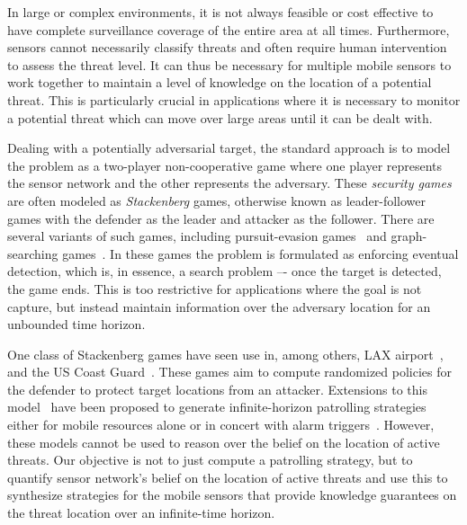 In large or complex environments, it is not always feasible or cost effective to have complete surveillance coverage of the entire area at all times. Furthermore, sensors cannot necessarily classify threats and often require human intervention to assess the threat level. It can thus be necessary for multiple mobile sensors to work together to maintain a level of knowledge on the location of a potential threat. This is particularly crucial in applications where it is necessary to monitor a potential threat which can move over large areas until it can be dealt with.  

Dealing with a potentially adversarial target, the standard approach is to model the problem as a two-player non-cooperative game where one player represents the sensor network and the other represents the adversary. These \emph{security games} are often modeled as \emph{Stackenberg} games, otherwise known as leader-follower games with the defender as the leader and attacker as the follower. There are several variants of such games, including pursuit-evasion games~\cite{Chung2011} and graph-searching games~\cite{Kreutzer11}. In these games the problem is formulated as enforcing eventual detection, which is, in essence, a search problem –- once the target is detected, the game ends. This is too restrictive for applications where the goal is not capture, but instead maintain information over the adversary location for an unbounded time horizon.

One class of Stackenberg games have seen use in, among others, LAX airport~\cite{Pita08},~\cite{jain2012overview} and the US Coast Guard~\cite{An11}. These games aim to compute randomized policies for the defender to protect target locations from an attacker. Extensions to this model~\cite{Basilico12} have been proposed to generate infinite-horizon patrolling strategies either for mobile resources alone or in concert with alarm triggers~\cite{basilico2016security,Munoz13}. However, these models cannot be used to reason over the belief on the location of active threats. Our objective is not to just compute a patrolling strategy, but to quantify sensor network's belief on the location of active threats and use this to synthesize strategies for the mobile sensors that provide knowledge guarantees on the threat location over an infinite-time horizon.

